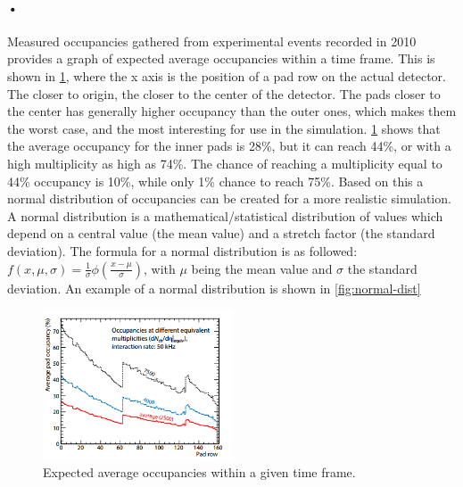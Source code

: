 \documentclass[a4paper, 12pt]{report}\dfrac{\right }{•}
\begin{document}
\paragraph{•}
Measured occupancies gathered from experimental events recorded in 2010 provides a graph of expected average occupancies within a time frame.
This is shown in \ref{fig:expected-occupancy}, where the x axis is the position of a pad row on the actual detector.
The closer to origin, the closer to the center of the detector.
The pads closer to the center has generally higher occupancy than the outer ones, which makes them the worst case, and the most interesting for use in the simulation.
\ref{fig:expected-occupancy} shows that the average occupancy for the inner pads is 28\%, but it can reach 44\%, or with a high multiplicity as high as 74\%.
The chance of reaching a multiplicity equal to 44\% occupancy is 10\%, while only 1\% chance to reach 75\%.
Based on this a normal distribution of occupancies can be created for a more realistic simulation.
A normal distribution is a mathematical/statistical distribution of values which depend on a central value (the mean value) and a stretch factor (the standard deviation)\cite{normal-dist}.
The formula for a normal distribution is as followed: $f(x,\mu,\sigma) = \frac{1}{\sigma}\phi(\frac{x-\mu}{\sigma})  $, with $ \mu$ being the mean value and $ \sigma$ the standard deviation. 
An example of a normal distribution is shown in \ref{fig:normal-dist}

\begin{figure}[h!]
	\centering
		\includegraphics[width=0.5\textwidth]{images/expected-occupancy.png}
		\caption[Expected average occupancies within a given time frame.]{Expected average occupancies within a given time frame. \cite{tdr-016}}
		\label{fig:expected-occupancy}
\end{figure}
\end{document}
